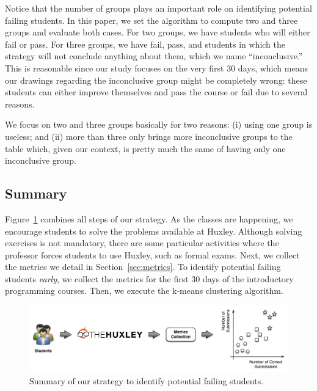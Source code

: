 Notice that the number of groups plays an important role on identifying potential failing students. In this paper, we set the algorithm to compute two and three groups and evaluate both cases. For two groups, we have students who will either fail or pass. For three groups, we have fail, pass, and students in which the strategy will not conclude anything about them, which we name ``inconclusive.'' This is reasonable since our study focuses on the very first 30 days, which means our drawings regarding the inconclusive group might be completely wrong: these students can either improve themselves and pass the course or fail due to several reasons.

We focus on two and three groups basically for two reasons: (i) using one group is useless; and (ii) more than three only brings more inconclusive groups to the table which, given our context, is pretty much the same of having only one inconclusive group.

\subsection{Summary}

Figure~\ref{fig:strategy} combines all steps of our strategy. As the classes are happening, we encourage students to solve the problems available at Huxley. Although solving exercises is not mandatory, there are some particular activities where the professor forces students to use Huxley, such as formal exams. Next, we collect the metrics we detail in Section~\ref{sec:metrics}. To identify potential failing students \textit{early}, we collect the metrics for the first 30 days of the introductory programming courses. Then, we execute the k-means clustering algorithm.

\begin{figure}[htb]
\centering
\includegraphics[width=1.0\textwidth,natwidth=610,natheight=642]{images/Strategy.pdf}
\caption{Summary of our strategy to identify potential failing students.}
\label{fig:strategy}
\end{figure}


